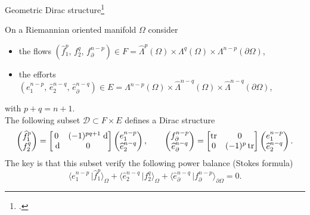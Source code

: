 \documentclass[aspectratio=169]{beamer}
\DeclareMathOperator{\tr}{tr}
\newcommand{\dualpr}[3][]{\ensuremath{\langle #2 \, \vert #3 \rangle_{#1}}}
\newcommand*{\dual}[1]{\ensuremath{\widehat{#1}}}
\begin{document}
	\begin{frame}{Geometric Dirac structure\footcite{vanderSchaft2002}}
		\begin{tcolorbox}[nobeforeafter, colframe=theme,title=Dirac structure for differential forms]%
			On a Riemannian oriented manifold $\Omega$ consider
			\begin{itemize}
				\item the flows $(\dual{f}^p_1, \, f^q_2, \, f_\partial^{n-p}) \in F = \dual{\Lambda}^p(\Omega) \times \Lambda^q(\Omega) \times \Lambda^{n-p}(\partial\Omega)$,
				\item the efforts $(e_1^{n-p}, \, \dual{e}_2^{n-q}, \, \dual{e}_\partial^{n-q}) \in E = \Lambda^{n-p}(\Omega) \times \dual{\Lambda}^{n-q}(\Omega) \times \dual{\Lambda}^{n-q}(\partial\Omega)$,
			\end{itemize}
			with $p+q=n+1$. \\
			The following subset $\mathcal{D} \subset F \times E$ defines a Dirac structure
			\begin{equation*}
				\begin{pmatrix}
					\dual{f}^p_1 \\
					{f}^q_2
				\end{pmatrix} = 
				\begin{bmatrix}
					0 & (-1)^{pq+1} \d \\
					\d & 0 \\
				\end{bmatrix}
				\begin{pmatrix}
					{e}^{n-p}_1 \\
					\dual{e}^{n-q}_2
				\end{pmatrix}, \qquad 
				\begin{pmatrix}
					{f}_\partial^{n-p} \\
					\dual{e}_\partial^{n-q}
				\end{pmatrix} = 
				\begin{bmatrix}
					\tr & 0 \\
					0 &  (-1)^p\tr
				\end{bmatrix}
				\begin{pmatrix}
					{e}^{n-p}_1 \\
					\dual{e}^{n-q}_2
				\end{pmatrix}.
			\end{equation*}
			The key is that this subset verify the following power balance (Stokes formula)
			\begin{equation*}\label{eq:bal_eq}
				\dualpr[\Omega]{e^{n-p}_1}{\dual{f}^p_1} + \dualpr[\Omega]{\dual{e}^{n-q}_2}{f^q_2} + \dualpr[\partial\Omega]{\dual{e}_\partial^{n-q}}{{f}_\partial^{n-p}} = 0.
			\end{equation*}
		\end{tcolorbox} 
		
		
	\end{frame}
	
\end{document}
